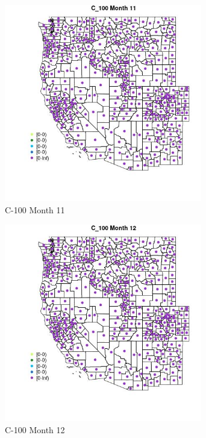 \begin{figure} 
\centering  
\includegraphics[width=0.77\textwidth]{Code_Outputs/df_report_ML_predictors_CountyCentroid_Locations_Dates_2008-01-01to2018-12-31_MapObsMo11C_100.jpg} 
\caption{\label{fig:df_report_ML_predictors_CountyCentroid_Locations_Dates_2008-01-01to2018-12-31MapObsMo11C_100}C-100 Month 11} 
\end{figure} 
 

\begin{figure} 
\centering  
\includegraphics[width=0.77\textwidth]{Code_Outputs/df_report_ML_predictors_CountyCentroid_Locations_Dates_2008-01-01to2018-12-31_MapObsMo12C_100.jpg} 
\caption{\label{fig:df_report_ML_predictors_CountyCentroid_Locations_Dates_2008-01-01to2018-12-31MapObsMo12C_100}C-100 Month 12} 
\end{figure} 
 


